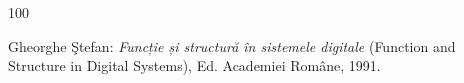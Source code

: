 \begin{thebibliography}{100}









  Gheorghe \c Stefan: {\em Funcție și structură în sistemele digitale} (Function and Structure in Digital Systems), Ed. Academiei Române, 1991.



\end{thebibliography}
